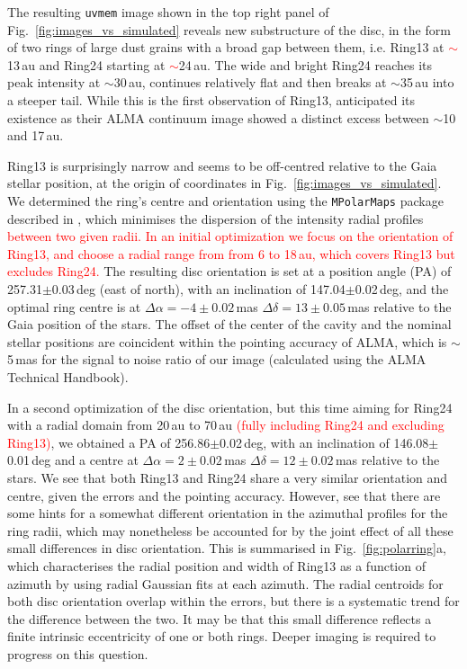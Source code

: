 \documentclass[fleqn,usenatbib,useAMS]{mnras}
\newcommand{\red}[1]{\textcolor{red}{#1}}
\begin{document}
The resulting {\tt uvmem} image shown in the top right panel of Fig.~\ref{fig:images_vs_simulated} reveals new substructure of the disc, in the form of two rings of large dust grains with a broad gap between them, i.e. Ring13 at \red{$\sim$}13\,au and Ring24 starting at \red{$\sim$}24\,au. The wide and bright Ring24 reaches its peak intensity at $\sim$30\,au, continues relatively flat and then breaks at $\sim$35\,au into a steeper tail. While this is the first observation of Ring13, \citet{Ru_z_Rodr_guez_2019} anticipated its existence as their ALMA continuum image showed a distinct excess between $\sim$10 and 17\,au.

Ring13 is surprisingly narrow and seems to be off-centred relative to the Gaia stellar position, at the origin of coordinates in Fig.~\ref{fig:images_vs_simulated}. We determined the ring's centre and orientation using the {\tt MPolarMaps} package described in \citep{10.1093/mnras/stab2359}, which minimises the dispersion of the intensity radial profiles \red{between two given radii. In an initial optimization we focus on the orientation of Ring13, and choose a radial range from from 6 to 18\,au, which covers Ring13 but excludes Ring24.} The resulting disc orientation is set at a position angle (PA) of 257.31$\pm$0.03\,deg (east of north), with an inclination of 147.04$\pm$0.02\,deg, and the optimal ring centre is at $\Delta \alpha = -4\pm0.02$\,mas $\Delta \delta = 13\pm0.05$\,mas relative to the Gaia position of the stars. The offset of the center of the cavity and the nominal stellar positions are coincident within the pointing accuracy of ALMA, which  is $\sim$5\,mas for the signal to noise ratio of our image (calculated using the ALMA Technical Handbook).

In a second optimization of the disc orientation, but this time aiming for Ring24 with a radial domain from 20\,au to 70\,au \red{(fully including Ring24 and excluding Ring13)}, we obtained a PA of 256.86$\pm$0.02\,deg, with an inclination of 146.08$\pm$0.01\,deg and a centre at $\Delta \alpha = 2\pm0.02$\,mas $\Delta \delta = 12\pm0.02$\,mas relative to the stars. We see that both Ring13 and Ring24 share a very similar orientation and centre, given the errors and the pointing accuracy. However, see that there are some hints for a somewhat different orientation in the azimuthal profiles for the ring radii, which may nonetheless be accounted for by the joint effect of all these small differences in disc orientation. This is summarised in Fig.~\ref{fig:polarring}a, which characterises the radial position and width of Ring13 as a function of azimuth by using radial Gaussian fits at each azimuth. The radial centroids for both disc orientation overlap within the errors, but there is a systematic trend for the difference between the two. It may be that this small difference reflects a finite  intrinsic eccentricity of one or both rings. Deeper imaging is required to progress on this question.
\end{document}
